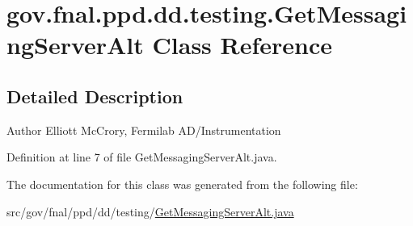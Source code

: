 \hypertarget{classgov_1_1fnal_1_1ppd_1_1dd_1_1testing_1_1GetMessagingServerAlt}{\section{gov.\-fnal.\-ppd.\-dd.\-testing.\-Get\-Messaging\-Server\-Alt Class Reference}
\label{classgov_1_1fnal_1_1ppd_1_1dd_1_1testing_1_1GetMessagingServerAlt}
}


\subsection{Detailed Description}
\begin{DoxyAuthor}{Author}
Elliott Mc\-Crory, Fermilab A\-D/\-Instrumentation 
\end{DoxyAuthor}


Definition at line 7 of file Get\-Messaging\-Server\-Alt.\-java.



The documentation for this class was generated from the following file\-:\begin{DoxyCompactItemize}
\item 
src/gov/fnal/ppd/dd/testing/\hyperlink{GetMessagingServerAlt_8java}{Get\-Messaging\-Server\-Alt.\-java}\end{DoxyCompactItemize}
